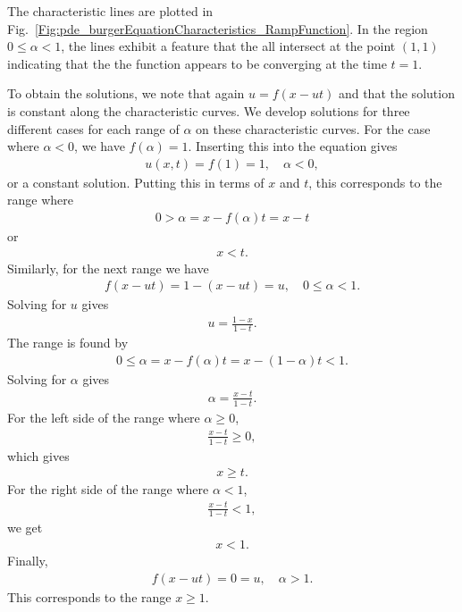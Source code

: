 The characteristic lines are plotted in Fig.~\ref{Fig:pde_burgerEquationCharacteristics_RampFunction}. In the region $0 \le \alpha < 1$, the lines exhibit a feature that the all intersect at the point $(1,1)$ indicating that the the function appears to be converging at the time $t = 1$. 


To obtain the solutions, we note that again $u = f(x - ut)$ and that the solution is constant along the characteristic curves. We develop solutions for three different cases for each range of $\alpha$ on these characteristic curves. For the case where $\alpha < 0$, we have $f(\alpha) = 1$. Inserting this into the equation gives 
\begin{align}
  u(x,t) = f(1) = 1, \quad \alpha < 0, \nonumber
\end{align}
or a constant solution. Putting this in terms of $x$ and $t$, this corresponds to the range where
\begin{align}
  0 > \alpha = x - f(\alpha) t = x - t \nonumber
\end{align}
or
\begin{align}
  x < t. \nonumber
\end{align}
Similarly, for the next range we have
\begin{align}
  f(x - ut) = 1 - (x - ut) = u, \quad 0 \le \alpha < 1 . \nonumber
\end{align}
Solving for $u$ gives
\begin{align}
  u = \frac{ 1 - x }{ 1 - t } . \nonumber
\end{align}
The range is found by 
\begin{align}
  0 \le \alpha = x - f(\alpha) t = x - ( 1 - \alpha ) t < 1. \nonumber
\end{align}  
Solving for $\alpha$ gives
\begin{align}
  \alpha = \frac{ x - t }{ 1 - t } . \nonumber
\end{align}
For the left side of the range where $\alpha \ge 0$,
\begin{align}
  \frac{ x - t }{ 1 - t }  \ge 0, \nonumber
\end{align}
which gives 
\begin{align}
  x \ge t. \nonumber
\end{align}
For the right side of the range where $\alpha < 1$,
\begin{align}
  \frac{ x - t }{ 1 - t }  < 1, \nonumber
\end{align}
we get 
\begin{align}
  x < 1. \nonumber
\end{align}  
Finally,
\begin{align}
  f(x - ut) = 0 = u, \quad \alpha > 1. \nonumber
\end{align}
This corresponds to the range $x \ge 1$.

